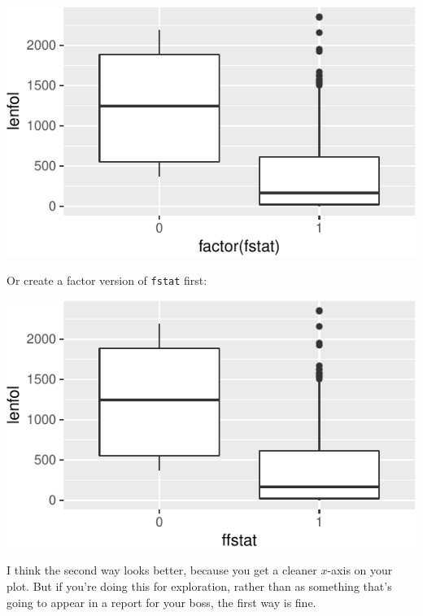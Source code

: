 \documentclass[]{tufte-book}
\newenvironment{Shaded}{}{}
\newcommand{\DataTypeTok}[1]{\textcolor[rgb]{0.56,0.13,0.00}{#1}}
\newcommand{\KeywordTok}[1]{\textcolor[rgb]{0.00,0.44,0.13}{\textbf{#1}}}
\newcommand{\NormalTok}[1]{#1}
\newcommand{\OperatorTok}[1]{\textcolor[rgb]{0.40,0.40,0.40}{#1}}
\newcommand{\StringTok}[1]{\textcolor[rgb]{0.25,0.44,0.63}{#1}}
\theoremstyle{definition}
\theoremstyle{definition}
\theoremstyle{definition}
\theoremstyle{remark}
\begin{document}
\includegraphics{13-dates-and-times_files/figure-latex/unnamed-chunk-9-1}

Or create a factor version of \texttt{fstat} first:

\begin{Shaded}
\end{Shaded}

\includegraphics{13-dates-and-times_files/figure-latex/unnamed-chunk-10-1}

I think the second way looks better, because you get a cleaner
\(x\)-axis on your plot. But if you're doing this for exploration,
rather than as something that's going to appear in a report for your
boss, the first way is fine.
\end{document}
